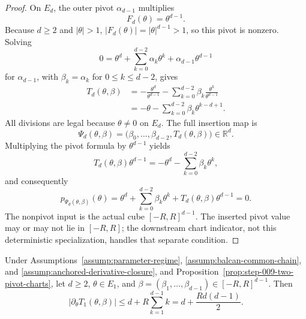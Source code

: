 \begin{proof}
On \(E_d\), the outer pivot \(\alpha_{d-1}\) multiplies
\begin{equation}
\label{eq:appendix-display-274}
F_d(\theta)=\theta^{d-1}.
\end{equation}
Because \(d\geq2\) and \(\lvert\theta\rvert>1\),
\(\lvert F_d(\theta)\rvert=\lvert\theta\rvert^{d-1}>1\), so this pivot is nonzero. Solving
\begin{equation}
\label{eq:appendix-display-275}
0=\theta^d+\sum_{k=0}^{d-2}\alpha_k\theta^k
+\alpha_{d-1}\theta^{d-1}
\end{equation}
for \(\alpha_{d-1}\), with \(\beta_k=\alpha_k\) for \(0\leq k\leq d-2\), gives
\begin{equation}
\label{eq:appendix-display-276}
\begin{aligned}
T_d(\theta,\beta)
&=-\frac{\theta^d}{\theta^{d-1}}
  -\sum_{k=0}^{d-2}\beta_k\frac{\theta^k}{\theta^{d-1}}\\
&=-\theta-\sum_{k=0}^{d-2}\beta_k\theta^{k-d+1}.
\end{aligned}
\end{equation}
All divisions are legal because \(\theta\neq0\) on \(E_d\). The full insertion map is
\begin{equation}
\label{eq:appendix-display-277}
\Psi_d(\theta,\beta)
=\bigl(\beta_0,\ldots,\beta_{d-2},T_d(\theta,\beta)\bigr)
\in\mathbb R^d.
\end{equation}
Multiplying the pivot formula by \(\theta^{d-1}\) yields
\begin{equation}
\label{eq:appendix-display-278}
T_d(\theta,\beta)\theta^{d-1}
=-\theta^d-\sum_{k=0}^{d-2}\beta_k\theta^k,
\end{equation}
and consequently
\begin{equation}
\label{eq:appendix-display-279}
p_{\Psi_d(\theta,\beta)}(\theta)
=\theta^d+\sum_{k=0}^{d-2}\beta_k\theta^k
+T_d(\theta,\beta)\theta^{d-1}
=0.
\end{equation}
The nonpivot input is the actual cube \([-R,R]^{d-1}\). The inserted pivot value may or may not lie in \([-R,R]\); the downstream chart indicator, not this deterministic specialization, handles that separate condition.
\end{proof}

\begin{lemma} \label{lem:step-009-inner-velocity}
Under Assumptions~\ref{assump:parameter-regime}, \ref{assump:balcan-common-chain}, and \ref{assump:anchored-derivative-closure}, and Proposition~\ref{prop:step-009-two-pivot-charts}, let \(d\geq2\), \(\theta\in E_1\), and \(\beta=(\beta_1,\ldots,\beta_{d-1})\in[-R,R]^{d-1}\). Then
\begin{equation}
\label{eq:appendix-display-280}
\lvert\partial_\theta T_1(\theta,\beta)\rvert
\leq d+R\sum_{k=1}^{d-1}k
=d+\frac{Rd(d-1)}2.
\end{equation}


\end{lemma}

